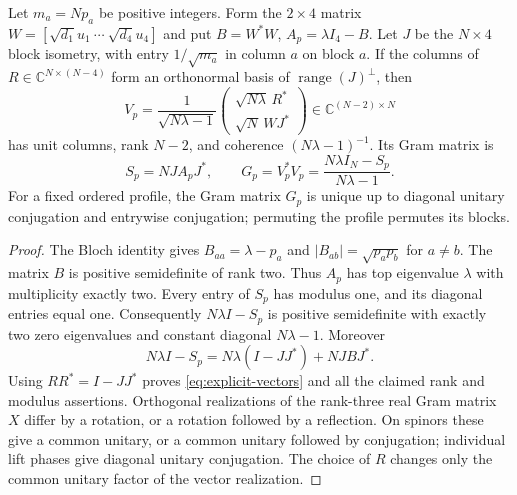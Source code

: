 \begin{proposition}\label{prop:construction}
Let $m_a=Np_a$ be positive integers. Form the $2\times4$ matrix
$W=[\sqrt{d_1}u_1\ \cdots\ \sqrt{d_4}u_4]$ and put
$B=W^*W$, $A_p=\lambda I_4-B$. Let $J$ be the $N\times4$ block
isometry, with entry $1/\sqrt{m_a}$ in column $a$ on block $a$.
If the columns of $R\in\mathbb C^{N\times(N-4)}$ form an orthonormal
basis of $\operatorname{range}(J)^\perp$, then
\begin{equation}\label{eq:explicit-vectors}
 V_p=\frac{1}{\sqrt{N\lambda-1}}
 \begin{pmatrix}\sqrt{N\lambda}\,R^*\\ \sqrt N\,WJ^*\end{pmatrix}
 \in\mathbb C^{(N-2)\times N}
\end{equation}
has unit columns, rank $N-2$, and coherence $(N\lambda-1)^{-1}$.
Its Gram matrix is
\begin{equation}\label{eq:attaining-gram}
 S_p=NJA_pJ^*,\qquad
 G_p=V_p^*V_p=\frac{N\lambda I_N-S_p}{N\lambda-1}.
\end{equation}
For a fixed ordered profile, the Gram matrix $G_p$ is unique up to
diagonal unitary conjugation and entrywise conjugation; permuting the
profile permutes its blocks.
\end{proposition}
\begin{proof}
The Bloch identity gives $B_{aa}=\lambda-p_a$ and
$|B_{ab}|=\sqrt{p_ap_b}$ for $a\ne b$. The matrix $B$ is positive
semidefinite of rank two. Thus $A_p$ has top eigenvalue $\lambda$
with multiplicity exactly two. Every entry of $S_p$ has modulus one,
and its diagonal entries equal one. Consequently $N\lambda I-S_p$
is positive semidefinite with exactly two zero eigenvalues and constant
diagonal $N\lambda-1$. Moreover
\[
 N\lambda I-S_p=N\lambda(I-JJ^*)+NJBJ^*.
\]
Using $RR^*=I-JJ^*$ proves \eqref{eq:explicit-vectors} and all the
claimed rank and modulus assertions. Orthogonal realizations of the
rank-three real Gram matrix $X$ differ by a rotation, or a rotation
followed by a reflection. On spinors these give a common unitary, or a
common unitary followed by conjugation; individual lift phases give
diagonal unitary conjugation. The choice of $R$ changes only the common
unitary factor of the vector realization.
\end{proof}

